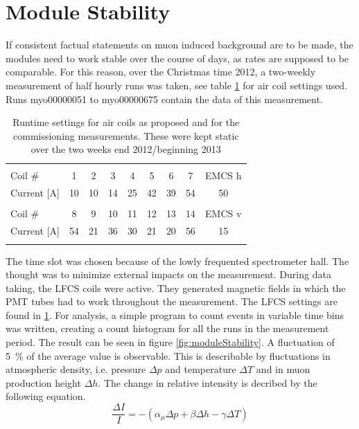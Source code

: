   \section{Module Stability}
  \label{ch:Analysis:sec:Module Stability}
  If consistent factual statements on muon induced background are to be made, the modules need to work stable over the course of days, as rates are supposed to be comparable. For this reason, over the Christmas time 2012, a two-weekly measurement of half hourly runs was taken, see table \ref{tab:airCoilSettingsChristmas} for air coil settings used. Runs myo00000051 to myo00000675 contain the data of this measurement.
  \begin{table}
  \centering
   \begin{tabular}{|l|ccccccc|c|}
    \hline
    &&&&&&&&\\
    Coil \#	&1	&2	&3	&4	&5	&6	&7	&EMCS h	\\
    Current [A]	&10	&10	&14	&25	&42	&39	&54	&50  	\\
    &&&&&&&&\\
    Coil \# 	&8	&9	&10	&11	&12	&13	&14	&EMCS v	\\
    Current [A]	&54	&21	&36	&30	&21	&20	&56	&15    	\\
    &&&&&&&&\\
    \hline
   \end{tabular}
  \caption[LFCS settings stability measurement]{Runtime settings for air coils as proposed and for the commissioning measurements. These were kept static over the two weeks end 2012/beginning 2013}
  \label{tab:airCoilSettingsChristmas}
  \end{table}
  The time slot was chosen because of the lowly frequented spectrometer hall. The thought was to minimize external impacts on the measurement. During data taking, the LFCS coils were active. They generated magnetic fields in which the PMT tubes had to work throughout the measurement. The LFCS settings are found in \ref{tab:airCoilSettingsChristmas}. For analysis, a simple program to count events in variable time bins was written, creating a count histogram for all the runs in the measurement period. The result can be seen in figure \ref{fig:moduleStability}. A fluctuation of \SI{5}{\percent} of the average value is observable. This is describable by fluctuations in atmospheric density, i.e. pressure $\Delta p$ and temperature $\Delta T$ and in muon production height $\Delta h$. The change in relative intensity is decribed by the following equation.
  \begin{equation}
  	\frac{\Delta I}{I} = - (\alpha_\mu\Delta p + \beta \Delta h -\gamma \Delta T)
  	\label{eq:muonStability}
  \end{equation}
